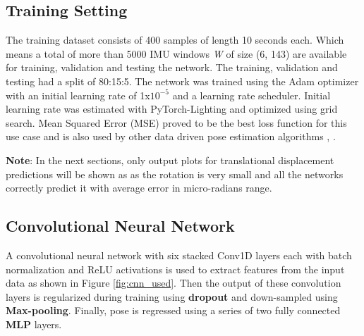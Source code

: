 \subsection{Training Setting}
The training dataset consists of 400 samples of length 10 seconds each. Which means a total of more than 5000 IMU windows \textit{W} of size (6, 143) are available for training, validation and testing the network. The training, validation and testing had a split of 80:15:5. The network was trained using the Adam optimizer with an initial learning rate of 1x$ 10^{-5} $ and a learning rate scheduler. Initial learning rate was estimated with PyTorch-Lighting and optimized using grid search. Mean Squared Error (MSE) proved to be the best loss function for this use case and is also used by other data driven pose estimation algorithms \citep{yan2018ridi}, \citep{herath2020ronin}.

\textbf{Note}: In the next sections, only output plots for translational displacement predictions will be shown as as the rotation is very small and all the networks correctly predict it with average error in micro-radians range.

\subsection{Convolutional Neural Network}
A convolutional neural network with six stacked Conv1D layers each with batch normalization and ReLU activations is used to extract features from the input data as shown in Figure \ref{fig:cnn_used}. Then the output of these convolution layers is regularized during training using \textbf{dropout} and down-sampled using \textbf{Max-pooling}. Finally, pose is regressed using a series of two fully connected \textbf{MLP} layers.

